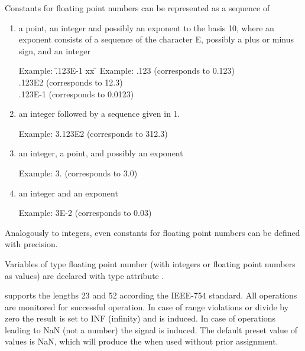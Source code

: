 Constants for floating point numbers can be represented as a sequence of
\begin{enumerate}
\item a point, an integer and possibly an exponent to the basis 10,
where an exponent consists of a sequence of the character E, possibly a
plus or minus sign, and an integer

\begin{tabbing}
Example: \= .123E-1 xx \=  \kill
Example: \> .123 \> (corresponds to 0.123)\\
 \> .123E2 \> (corresponds to 12.3)\\
 \> .123E-1 \> (corresponds to 0.0123)
\end{tabbing}

\item an integer followed by a sequence given in 1.

Example: 3.123E2 (corresponds to 312.3)

\item an integer, a point, and possibly an exponent

Example: 3. (corresponds to 3.0)

\item an integer and an exponent

Example: 3E-2 (corresponds to 0.03)
\end{enumerate}

Analogously to integers, even constants for floating point numbers can
be defined with precision.

Variables of type floating point number (with integers or floating point
numbers as values) are declared with type attribute .

\begin{grammarframe}
\end{grammarframe}


\OpenPEARL{} supports the lengths 23 and 52 according the IEEE-754 
standard.
All operations are monitored for successful operation.
In case of range violations or
divide by zero the result is set to INF (infinity) and
 is induced.
In case of operations leading to NaN (not a number) the signal
 is induced.
The default preset value of  values is NaN, which will produce
the  when used without prior assignment.

